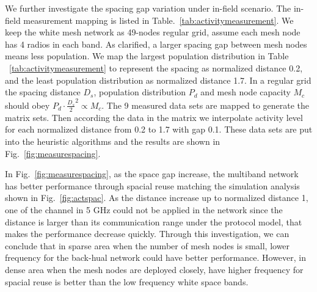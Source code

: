 We further investigate the spacing gap variation under in-field scenario.
The in-field measurement mapping is listed in Table.~\ref{tab:activitymeasurement}. 
We keep the white mesh network as 49-nodes regular grid, assume each mesh 
node has 4 radios in each band. As clarified, a larger spacing gap between mesh 
nodes means less population. We map the largest population distribution in Table
~\ref{tab:activitymeasurement} to represent the spacing as normalized distance 0.2,
and the least population distribution as normalized distance 1.7. 
In a regular grid the spacing distance $D_s$, population distribution $P_d$ and 
mesh node capacity $M_c$ should obey $P_d \cdot \frac{D_s}{2} ^2 \propto M_c$. 
The 9 measured data sets are mapped to generate the matrix sets. Then according 
the data in the matrix we interpolate activity level for each normalized distance 
from 0.2 to 1.7 with gap 0.1. These data sets are put into the heuristic algorithms 
and the results are shown in Fig.~\ref{fig:measurespacing}.

\begin{figure}[t]
\centering
{}
\hfill
\caption{}
\label{fig:all3figs}
\vspace{-0.1in}
\end{figure}

In Fig.~\ref{fig:measurespacing}, as the space gap increase, the multiband network 
has better performance through spacial reuse matching the simulation analysis shown 
in Fig.~\ref{fig:actspac}. As the distance increase up to normalized distance 1, one of 
the channel in 5 GHz could not be applied in the network since the distance is larger 
than its communication range under the protocol model, that makes the performance 
decrease quickly. Through this investigation, we can conclude that in sparse area
when the number of mesh nodes is small, lower frequency for the back-hual network 
could have better performance. However, in dense area when the mesh nodes are deployed 
closely, have higher frequency for spacial reuse is better than the low frequency 
white space bands.


